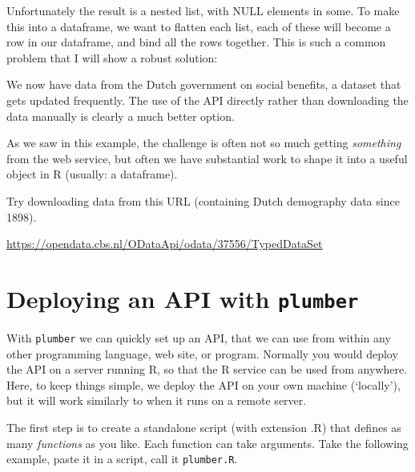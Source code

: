 \documentclass[]{book}
\newenvironment{Shaded}{\begin{snugshade}}{\end{snugshade}}
\newcommand{\CommentTok}[1]{\textcolor[rgb]{0.56,0.35,0.01}{\textit{#1}}}
\newcommand{\KeywordTok}[1]{\textcolor[rgb]{0.13,0.29,0.53}{\textbf{#1}}}
\newcommand{\NormalTok}[1]{#1}
\newcommand{\OperatorTok}[1]{\textcolor[rgb]{0.81,0.36,0.00}{\textbf{#1}}}
\newcommand{\StringTok}[1]{\textcolor[rgb]{0.31,0.60,0.02}{#1}}
\let\BeginKnitrBlock\begin \let\EndKnitrBlock\end
\begin{document}
Unfortunately the result is a nested list, with NULL elements in some. To make this into a dataframe, we want to flatten each list, each of these will become a row in our dataframe, and bind all the rows together. This is such a common problem that I will show a robust solution:

\begin{Shaded}
\end{Shaded}

We now have data from the Dutch government on social benefits, a dataset that gets updated frequently. The use of the API directly rather than downloading the data manually is clearly a much better option.

As we saw in this example, the challenge is often not so much getting \emph{something} from the web service, but often we have substantial work to shape it into a useful object in R (usually: a dataframe).

\BeginKnitrBlock{rmdtry}
Try downloading data from this URL (containing Dutch demography data since 1898).

\url{https://opendata.cbs.nl/ODataApi/odata/37556/TypedDataSet}
\EndKnitrBlock{rmdtry}

\hypertarget{deploying-an-api-with-plumber}{%
\section{\texorpdfstring{Deploying an API with \texttt{plumber}}{Deploying an API with plumber}}\label{deploying-an-api-with-plumber}}

With \texttt{plumber} we can quickly set up an API, that we can use from within any other programming language, web site, or program. Normally you would deploy the API on a server running R, so that the R service can be used from anywhere. Here, to keep things simple, we deploy the API on your own machine (`locally'), but it will work similarly to when it runs on a remote server.

The first step is to create a standalone script (with extension .R) that defines as many \emph{functions} as you like. Each function can take arguments. Take the following example, paste it in a script, call it \texttt{plumber.R}.
\end{document}
